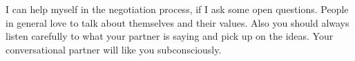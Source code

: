 
\noindent I can help myself in the negotiation process, if I ask some open
questions. People in general love to talk about themselves and
their values. Also you should always listen carefully
to what your partner is saying and pick up on the ideas.
Your conversational partner will like you subconsciously. \\






















